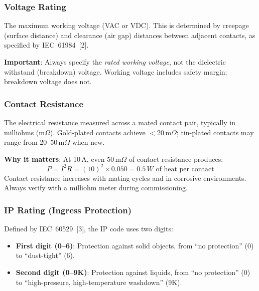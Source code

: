 \documentclass[11pt,letterpaper,twoside,openany]{book}
\begin{document}
\subsubsection{Voltage Rating}

The maximum working voltage (VAC or VDC). This is determined by creepage (surface distance) and clearance (air gap) distances between adjacent contacts, as specified by IEC~61984~[2]. 

\textbf{Important}: Always specify the \emph{rated working voltage}, not the dielectric withstand (breakdown) voltage. Working voltage includes safety margin; breakdown voltage does not.

\subsubsection{Contact Resistance}

The electrical resistance measured across a mated contact pair, typically in milliohms (m$\Omega$). Gold-plated contacts achieve $<$20\,m$\Omega$; tin-plated contacts may range from 20--50\,m$\Omega$ when new.

\textbf{Why it matters}: At 10\,A, even 50\,m$\Omega$ of contact resistance produces:
\begin{equation}
  P = I^2 R = (10)^2 \times 0.050 = 0.5\,W \text{ of heat per contact}
\end{equation}
Contact resistance increases with mating cycles and in corrosive environments. Always verify with a milliohm meter during commissioning.

\subsubsection{IP Rating (Ingress Protection)}

Defined by IEC~60529~[3], the IP code uses two digits:
\begin{itemize}[nosep,leftmargin=1.5em]
  \item \textbf{First digit (0--6)}: Protection against solid objects, from ``no protection'' (0) to ``dust-tight'' (6).
  \item \textbf{Second digit (0--9K)}: Protection against liquids, from ``no protection'' (0) to ``high-pressure, high-temperature washdown'' (9K).
\end{itemize}
\end{document}

